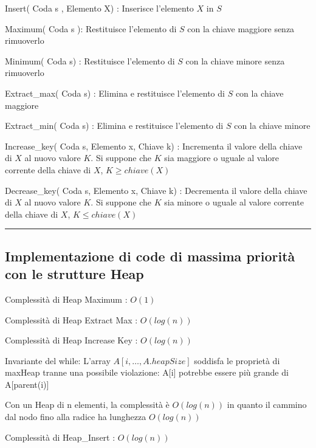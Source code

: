 \documentclass[tikz]{article}
\begin{document}
{{Insert( Coda s , Elemento X) : Inserisce l'elemento $X$ in $S$}

{Maximum( Coda s ): Restituisce l'elemento di $S$ con la chiave maggiore senza rimuoverlo}

{Minimum( Coda s) : Restituisce l'elemento di $S$ con la chiave minore senza rimuoverlo}

{Extract\_max( Coda s) : Elimina e restituisce l'elemento di $S$ con la chiave maggiore}

{Extract\_min( Coda s) : Elimina e restituisce l'elemento di $S$ con la chiave minore}

{Increase\_key( Coda s, Elemento x, Chiave k) : Incrementa il valore della chiave di $X$ al nuovo valore $K$. Si suppone che $K$ sia maggiore o uguale al valore corrente della chiave di $X$, $K \geq chiave(X)$}

{Decrease\_key( Coda s, Elemento x, Chiave k) : Decrementa il valore della chiave di $X$ al nuovo valore $K$. Si suppone che $K$ sia minore o uguale al valore corrente della chiave di $X$, $K \leq chiave(X)$}

\begin{center}\rule{0.5\linewidth}{\linethickness}\end{center}

\subsection{Implementazione di code di massima priorità con le strutture Heap}}



{Complessità di Heap Maximum : $O(1)$}



{Complessità di Heap Extract Max : $O(log(n))$}



{Complessità di Heap Increase Key : $O(log(n))$}

{Invariante del while: L'array $A[i,\ldots,A.heapSize]$ soddisfa le proprietà di maxHeap tranne una possibile violazione: A{[}i{]} potrebbe essere più grande di A{[}parent(i){]}}

{Con un Heap di n elementi, la complessità è $O(log(n))$ in quanto il cammino dal nodo fino alla radice ha lunghezza }$O(log(n))$



{Complessità di Heap\_Insert : }$O(log(n))$
\end{document}
